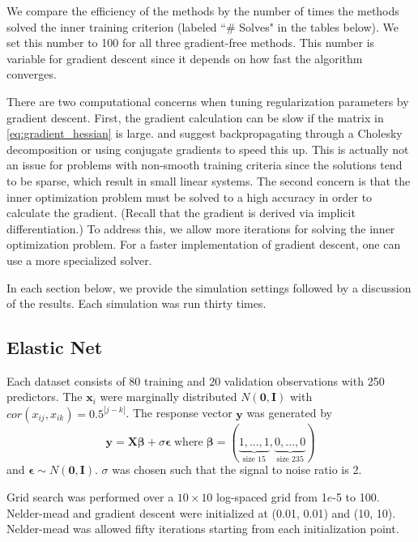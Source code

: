 \documentclass[12pt]{article}
\begin{document}
We compare the efficiency of the methods by the number of times the methods solved the inner training criterion (labeled ``\# Solves" in the tables below). We set this number to 100 for all three gradient-free methods. This number is variable for gradient descent since it depends on how fast the algorithm converges.

There are two computational concerns when tuning regularization parameters by gradient descent. First, the gradient calculation can be slow if the matrix in \eqref{eq:gradient_hessian} is large. \citet{bengio2000gradient} and \citet{foo2008efficient} suggest backpropagating through a Cholesky decomposition or using conjugate gradients to speed this up. This is actually not an issue for problems with non-smooth training criteria since the solutions tend to be sparse, which result in small linear systems. The second concern is that the inner optimization problem must be solved to a high accuracy in order to calculate the gradient. (Recall that the gradient is derived via implicit differentiation.) To address this, we allow more iterations for solving the inner optimization problem. For a faster implementation of gradient descent, one can use a more specialized solver.

In each section below, we provide the simulation settings followed by a discussion of the results. Each simulation was run thirty times. 

\subsection{Elastic Net}
Each dataset consists of 80 training and 20 validation observations with 250 predictors. The $\boldsymbol x_i$ were marginally distributed $N(\boldsymbol 0,\boldsymbol I)$ with $cor(x_{ij},x_{ik}) = 0.5^{|j-k|}$.
The response vector $\boldsymbol y$ was generated by
\begin{equation}
\boldsymbol y = \boldsymbol X \boldsymbol \beta + \sigma \boldsymbol \epsilon \; \text{where} \; \boldsymbol \beta = (\underbrace{1, ..., 1}_\text{size 15}, \underbrace{0, ..., 0}_\text{size 235})
\end{equation}
and $\boldsymbol \epsilon \sim N(\boldsymbol 0, \boldsymbol I)$. $\sigma$ was chosen such that the signal to noise ratio is 2. 

Grid search was performed over a $10 \times 10$ log-spaced grid from 1$e$-5 to 100. Nelder-mead and gradient descent were initialized at (0.01, 0.01) and (10, 10). Nelder-mead was allowed fifty iterations starting from each initialization point.
\end{document}

